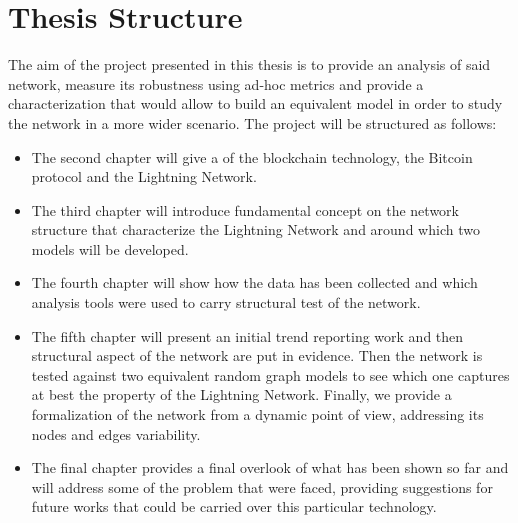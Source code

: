 	\section{Thesis Structure}
	
	The aim of the project presented in this thesis is to provide an analysis of said network, measure its robustness using ad-hoc metrics and provide a characterization that would allow to build an equivalent model in order to study the network in a more wider scenario. The project will be structured as follows:
	\begin{itemize}
		\item The second chapter will give a  of the blockchain technology, the Bitcoin protocol and the Lightning Network.
		\item The third chapter will introduce fundamental concept on the network structure that characterize the Lightning Network and around which two models will be developed.
		\item The fourth chapter will show how the data has been collected and which analysis tools were used to carry structural test of the network.
		\item The fifth chapter will present an initial trend reporting work and then structural aspect of the network are put in evidence. Then the network is tested against two equivalent random graph models to see which one captures at best the property of the Lightning Network. Finally, we provide a formalization of the network from a dynamic point of view, addressing its nodes and edges variability.
		\item The final chapter provides a final overlook of what has been shown so far and will address some of the problem that were faced, providing suggestions for future works that could be carried over this particular technology.
	\end{itemize}
